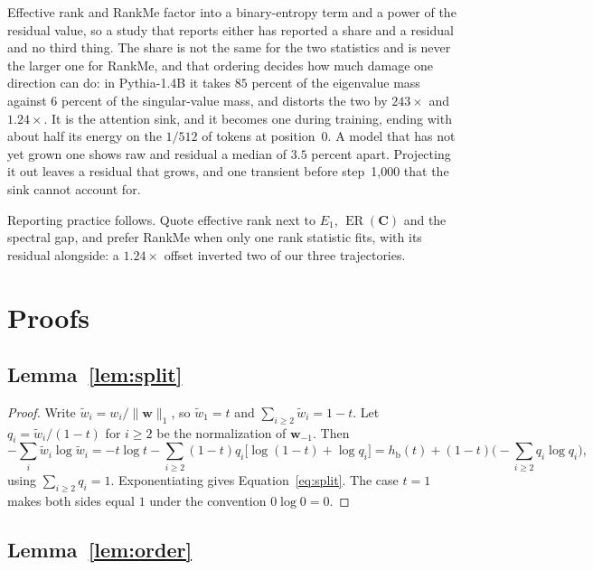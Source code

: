 \documentclass{article}
\theoremstyle{spaced}
\theoremstyle{definition}
\DeclareMathOperator{\ER}{ER}
\newcommand{\bC}{\mathbf{C}}
\newcommand{\bw}{\mathbf{w}}
\newcommand{\hb}{h_{\mathrm{b}}}
\begin{document}
Effective rank and RankMe factor into a binary-entropy term and a power of the residual value, so a study that reports either has reported a share and a residual and no third thing. The share is not the same for the two statistics and is never the larger one for RankMe, and that ordering decides how much damage one direction can do: in Pythia-1.4B it takes $85$ percent of the eigenvalue mass against $6$ percent of the singular-value mass, and distorts the two by $243\times$ and $1.24\times$. It is the attention sink, and it becomes one during training, ending with about half its energy on the $1/512$ of tokens at position~0. A model that has not yet grown one shows raw and residual a median of $3.5$ percent apart. Projecting it out leaves a residual that grows, and one transient before step~1{,}000 that the sink cannot account for.

Reporting practice follows. Quote effective rank next to $E_1$, $\ER(\bC)$ and the spectral gap, and prefer RankMe when only one rank statistic fits, with its residual alongside: a $1.24\times$ offset inverted two of our three trajectories.




\appendix

\section{Proofs}
\label{app:proofs}

\subsection{Lemma~\ref{lem:split}}

\begin{proof}
Write $\tilde{w}_i = w_i/\|\bw\|_1$, so $\tilde{w}_1 = t$ and $\sum_{i \ge 2}\tilde{w}_i = 1-t$. Let $q_i = \tilde{w}_i/(1-t)$ for $i \ge 2$ be the normalization of $\bw_{-1}$. Then
\[
-\sum_{i} \tilde{w}_i \log \tilde{w}_i
= -t\log t - \sum_{i\ge2}(1-t)q_i\big[\log(1-t) + \log q_i\big]
= \hb(t) + (1-t)\Big(-\sum_{i\ge2} q_i \log q_i\Big),
\]
using $\sum_{i \ge 2} q_i = 1$. Exponentiating gives Equation~\ref{eq:split}. The case $t=1$ makes both sides equal $1$ under the convention $0\log 0 = 0$.
\end{proof}

\subsection{Lemma~\ref{lem:order}}
\end{document}
